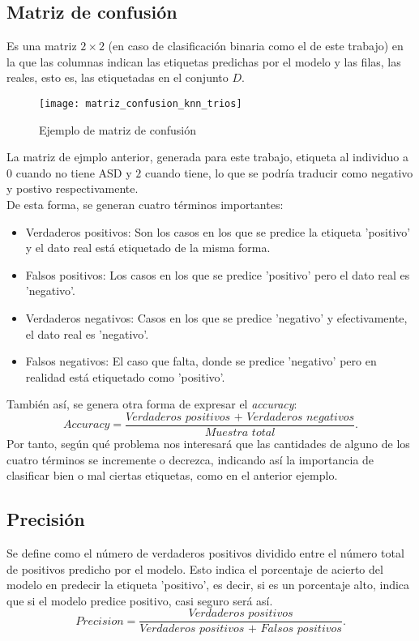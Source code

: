 \subsection{Matriz de confusión}
Es una matriz $2 \times 2$ (en caso de clasificación binaria como el de este trabajo) en la que las columnas indican las etiquetas predichas por el modelo y las filas, las reales, esto es, las etiquetadas en el conjunto $D$.
\begin{figure}[H]
  \centering
  \texttt{[image: matriz\_confusion\_knn\_trios]}
  \caption{Ejemplo de matriz de confusión}
  \label{fig:svm1}
\end{figure}
\begin{center}
\end{center}
La matriz de ejmplo anterior, generada para este trabajo, etiqueta al individuo a $0$ cuando no tiene ASD y $2$ cuando tiene, lo que se podría traducir como negativo y postivo respectivamente.\\
De esta forma, se generan cuatro términos importantes:
\begin{itemize}
  \item Verdaderos positivos: Son los casos en los que se predice la etiqueta 'positivo' y el dato real está etiquetado de la misma forma.
  \item Falsos positivos: Los casos en los que se predice 'positivo' pero el dato real es 'negativo'.
  \item Verdaderos negativos: Casos en los que se predice 'negativo' y efectivamente, el dato real es 'negativo'.
  \item Falsos negativos: El caso que falta, donde se predice 'negativo' pero en realidad está etiquetado como 'positivo'.
\end{itemize}
También así, se genera otra forma de expresar el \textit{accuracy}:
\[ Accuracy=\frac{\textit{Verdaderos positivos + Verdaderos negativos}}{\textit{Muestra total}}. \]
Por tanto, según qué problema nos interesará que las cantidades de alguno de los cuatro términos se incremente o decrezca, indicando así la importancia de clasificar bien o mal ciertas etiquetas, como en el anterior ejemplo.
\subsection{Precisión}
Se define como el número de verdaderos positivos dividido entre el número total de positivos predicho por el modelo. Esto indica el porcentaje de acierto del modelo en predecir la etiqueta 'positivo', es decir, si es un porcentaje alto, indica que si el modelo predice positivo, casi seguro será así.
\[ Precision=\frac{\textit{Verdaderos positivos}}{\textit{Verdaderos positivos + Falsos positivos}}. \]
